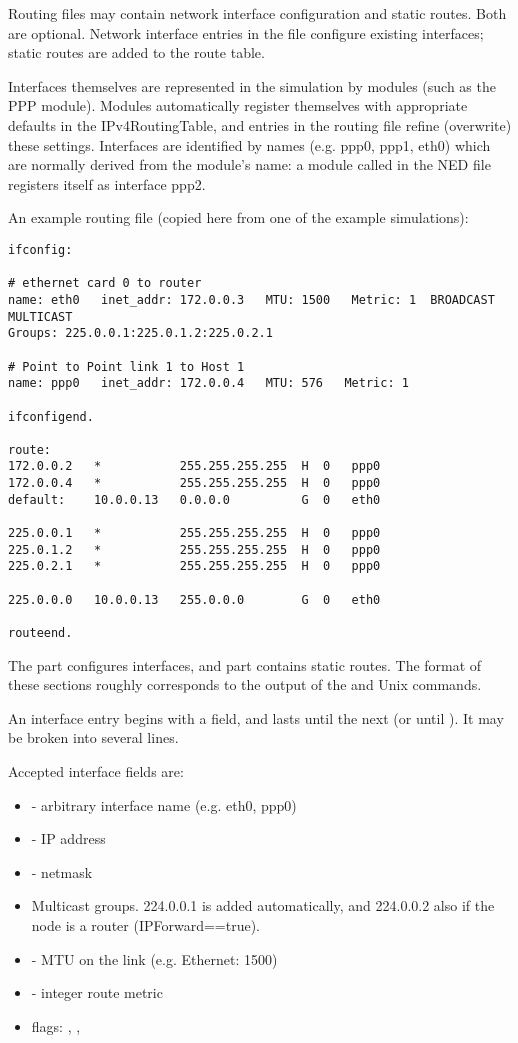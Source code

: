 Routing files may contain network interface configuration and static
routes. Both are optional. Network interface entries in the file
configure existing interfaces; static routes are added to the route table.

Interfaces themselves are represented in the simulation by modules
(such as the PPP module). Modules automatically register themselves
with appropriate defaults in the IPv4RoutingTable, and entries in the
routing file refine (overwrite) these settings.
Interfaces are identified by names (e.g. ppp0, ppp1, eth0) which
are normally derived from the module's name: a module called
 in the NED file registers itself as interface ppp2.

An example routing file (copied here from one of the example simulations):

\begin{verbatim}
ifconfig:

# ethernet card 0 to router
name: eth0   inet_addr: 172.0.0.3   MTU: 1500   Metric: 1  BROADCAST MULTICAST
Groups: 225.0.0.1:225.0.1.2:225.0.2.1

# Point to Point link 1 to Host 1
name: ppp0   inet_addr: 172.0.0.4   MTU: 576   Metric: 1

ifconfigend.

route:
172.0.0.2   *           255.255.255.255  H  0   ppp0
172.0.0.4   *           255.255.255.255  H  0   ppp0
default:    10.0.0.13   0.0.0.0          G  0   eth0

225.0.0.1   *           255.255.255.255  H  0   ppp0
225.0.1.2   *           255.255.255.255  H  0   ppp0
225.0.2.1   *           255.255.255.255  H  0   ppp0

225.0.0.0   10.0.0.13   255.0.0.0        G  0   eth0

routeend.
\end{verbatim}

The  part configures interfaces,
and  part contains static routes.
The format of these sections roughly corresponds to the output
of the  and  Unix commands.

An interface entry begins with a  field, and lasts until
the next  (or until ). It may
be broken into several lines.

Accepted interface fields are:

\begin{itemize}
  \item {} - arbitrary interface name (e.g. eth0, ppp0)
  \item {} - IP address
  \item {} - netmask
  \item {} Multicast groups. 224.0.0.1 is added automatically,
     and 224.0.0.2 also if the node is a router (IPForward==true).
  \item {} - MTU on the link (e.g. Ethernet: 1500)
  \item {} - integer route metric
  \item flags: , , 
\end{itemize}

